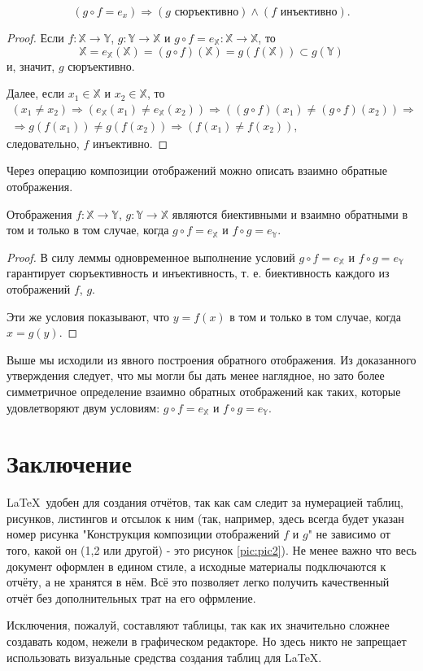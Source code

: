 \begin{lemma}

\begin{equation}
	(g \circ f=e_x) \Rightarrow (g \text{ сюръективно})\land(f \text{ инъективно}).
\end{equation}

\begin{proof} Если $f \colon \mathbb{X} \to \mathbb{Y}$, $g \colon \mathbb{Y} \to \mathbb{X}$ и $g \circ f=e_\mathbb{X} \colon \mathbb{X} \to \mathbb{X}$, то
\begin{equation}
\mathbb{X}=e_\mathbb{X}(\mathbb{X})=(g \circ f)(\mathbb{X})=g(f(\mathbb{X})) \subset g(\mathbb{Y})
\end{equation}
и, значит, $g$ сюръективно.

Далее, если $x_1 \in \mathbb{X}$ и $x_2 \in \mathbb{X}$, то
\begin{multline}
(x_1 \ne x_2) \Rightarrow (e_\mathbb{X}(x_1) \ne e_\mathbb{X}(x_2)) \Rightarrow ((g \circ f)(x_1) \ne (g \circ f)(x_2)) \Rightarrow \\
\Rightarrow g(f(x_1)) \ne g(f(x_2)) \Rightarrow (f(x_1) \ne f(x_2)),
\end{multline}
следовательно, $f$ инъективно.
\end{proof}
\end{lemma}

Через операцию композиции отображений можно описать взаимно обратные отображения.
\begin{proposition}
Отображения $f \colon \mathbb{X} \to \mathbb{Y}$, $g \colon \mathbb{Y} \to \mathbb{X}$ являются биективными и взаимно обратными в том и только в том случае, когда $g \circ f=e_\mathbb{X}$ и $f \circ g=e_\mathbb{Y}$.
\end{proposition}
\begin{proof}
В силу леммы одновременное выполнение условий $g \circ f=e_\mathbb{X}$ и $f \circ g=e_\mathbb{Y}$ гарантирует сюръективность и инъективность, т. е. биективность каждого
из отображений $f$, $g$.

Эти же условия показывают, что $y=f(x)$ в том и только в том случае, когда $x=g(y)$.
\end{proof}
Выше мы исходили из явного построения обратного отображения. Из доказанного утверждения следует, что мы могли бы дать менее наглядное, но
зато более симметричное определение взаимно обратных отображений как
таких, которые удовлетворяют двум условиям: $g \circ f=e_\mathbb{X}$ и $f \circ g=e_\mathbb{Y}$.

\newpage
\section*{Заключение}
\LaTeX\ удобен для создания отчётов, так как сам следит за нумерацией таблиц, рисунков, листингов и отсылок к ним (так, например, здесь всегда будет указан номер рисунка "Конструкция композиции отображений $f$ и $g$" не зависимо от того, какой он (1,2 или другой) - это рисунок \ref{pic:pic2}). Не менее важно что весь документ оформлен в едином стиле, а исходные материалы подключаются к отчёту, а не хранятся в нём. Всё это позволяет легко получить качественный отчёт без дополнительных трат на его офрмление.

Исключения, пожалуй, составляют таблицы, так как их значительно сложнее создавать кодом, нежели в графическом редакторе. Но здесь никто не запрещает использовать визуальные средства создания таблиц для \LaTeX.
